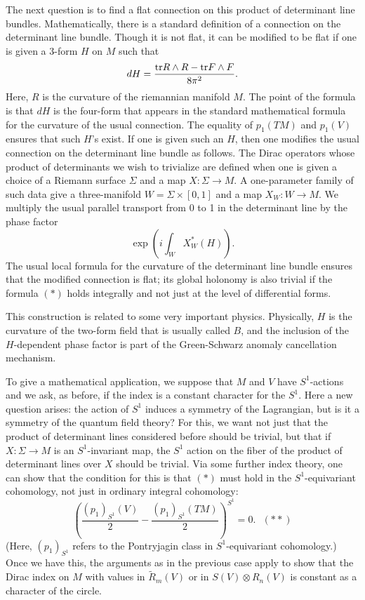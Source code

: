 The next question is to find a flat connection on this product of
determinant line bundles.  Mathematically, there is a standard
definition of a connection on the determinant line bundle.  Though it is not
flat, it can be modified to be flat if one is 
given a $3$-form $H$ on $M$ such that
$$dH=\frac{{\rm tr} R\wedge R-{\rm tr}F\wedge F}{8\pi^2}.$$
Here, $R$ is the curvature of the riemannian manifold $M$.
The point of the formula is that $dH$ is the four-form that appears
in the standard mathematical formula for the curvature of the usual connection.
The equality of $p_1(TM)$ and $p_1(V)$ ensures that such $H$'s exist.
If one is given such an $H$, then one modifies the usual connection
on the determinant line bundle as follows.  The Dirac operators whose
product of determinants we wish to trivialize are defined when one
is given a choice of a Riemann surface $\Sigma$ and a map $X:\Sigma\to M$.
A one-parameter family of such data give a three-manifold $W=\Sigma\times
[0,1]$ and a map $X_W:W\to M$.  We multiply the usual parallel
transport from 0 to 1 in the determinant line by
the phase factor
$${\exp(i\int_W X^*_W(H)).}$$
The usual local formula for the curvature of the determinant line bundle
ensures that the modified connection is flat; its global holonomy is also
trivial if the formula $(*)$ holds integrally and not just at the level
of differential forms.

This construction is related to some very important physics.
Physically, $H$ is the curvature of the two-form field that is usually
called $B$, and the inclusion of the $H$-dependent phase
 factor is part of the Green-Schwarz
anomaly cancellation mechanism.


To give a mathematical application,
 we  suppose that $M$ and $V$ have $S^1$-actions and we ask, as
before, if the index is a constant character for the $S^1$.
Here a new question arises:
the action of $S^1$ induces a symmetry of the Lagrangian, but is it a
symmetry of the quantum field theory?
For this, we want not just that
the  product of determinant lines considered
before should be trivial, but that  
if $X:\Sigma\to M$ is an $S^1$-invariant map, the $S^1$ action on the
fiber of the product
of determinant lines over $X$ should be trivial.
Via some further index theory, one can show that the condition
for this is that $(*)$ must hold in the $S^1$-equivariant cohomology,
not just in ordinary integral cohomology:
$$\left(\frac{(p_1)_{S^1}(V)}{2}-\frac{(p_1)_{S^1}(TM)}{2}\right)^{S^1}=0.
~~~(**)$$  
(Here, $(p_1)_{S^1}$ refers to the Pontryjagin class in
$S^1$-equivariant cohomology.)
Once we have this, the arguments as in the previous case apply to show
that the Dirac index on $M$ with values in $\tilde R_m(V)$ or in
$S(V)\otimes R_n(V)$ is constant as a character of the circle.

